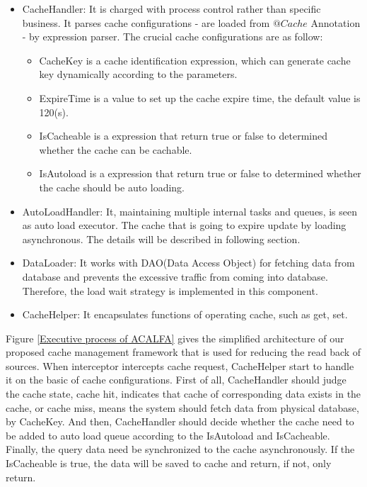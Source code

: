 \documentclass[conference]{IEEEtran}
\begin{document}
\begin{itemize}
    \item CacheHandler: It is charged with process control rather than specific business. It parses cache configurations - are loaded from $@Cache$ Annotation - by expression parser. The crucial cache configurations are as follow:
    \begin{itemize}
        \item CacheKey is a cache identification expression, which can generate cache key dynamically according to the parameters.
        \item ExpireTime is a value to set up the cache expire time, the default value is 120(s).
        \item IsCacheable is a expression that return true or false to determined whether the cache can be cachable.
        \item IsAutoload is a expression that return true or false to determined whether the cache should be auto loading.
    \end{itemize}
    \item AutoLoadHandler: It, maintaining multiple internal tasks and queues, is seen as auto load executor. The cache that is going to expire update by loading asynchronous. The details will be described in following section.
    \item DataLoader: It works with DAO(Data Access Object) for fetching data from database and prevents the excessive traffic from coming into database. Therefore, the load wait strategy is implemented in this component.
    \item CacheHelper: It encapsulates functions of operating cache, such as get, set.
\end{itemize}

Figure \ref{Executive process of ACALFA} gives the simplified architecture of our proposed cache management framework that is used for reducing the read back of sources. When interceptor intercepts cache request, CacheHelper start to handle it on the basic of cache configurations. First of all, CacheHandler should judge the cache state, cache hit, indicates that cache of corresponding data exists in the cache, or cache miss, means the system should fetch data from physical database, by CacheKey. And then, CacheHandler should decide whether the cache need to be added to auto load queue according to the IsAutoload and IsCacheable. Finally, the query data need be synchronized to the cache asynchronously. If the IsCacheable is true, the data will be saved to cache and return, if not, only return.
\end{document}
